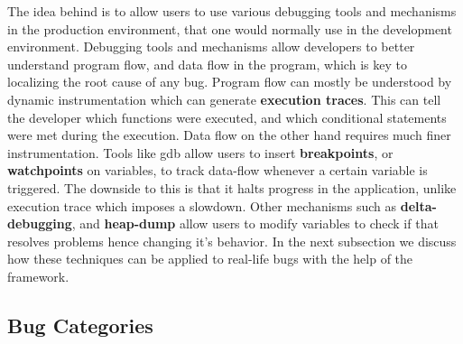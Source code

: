 
The idea behind \parikshan is to allow users to use various debugging tools and mechanisms in the production environment, that one would normally use in the development environment.
Debugging tools and mechanisms allow developers to better understand program flow, and data flow in the program, which is key to localizing the root cause of any bug.
Program flow can mostly be understood by dynamic instrumentation which can generate \textbf{execution traces}. 
This can tell the developer which functions were executed, and which conditional statements were met during the execution.
Data flow on the other hand requires much finer instrumentation. 
Tools like gdb allow users to insert \textbf{breakpoints}, or \textbf{watchpoints} on variables, to track data-flow whenever a certain variable is triggered.
The downside to this is that it halts progress in the application, unlike execution trace which imposes a slowdown. 
Other mechanisms such as \textbf{delta-debugging}, and \textbf{heap-dump} allow users to modify variables to check if that resolves problems hence changing it's behavior.
In the next subsection we discuss how these techniques can be applied to real-life bugs with the help of the \parikshan framework.

\subsection{Bug Categories}
\label{sec:bugCategories}



